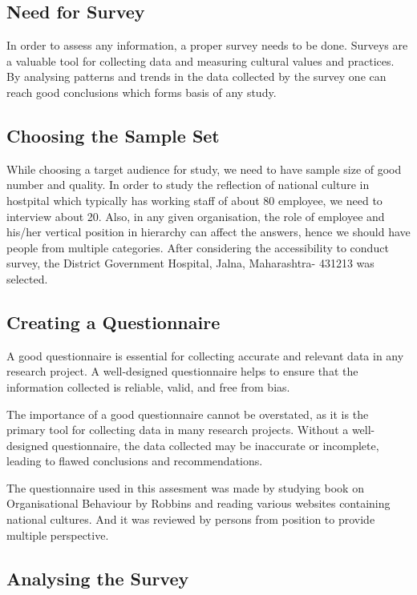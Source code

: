 \documentclass{article}
\begin{document}
\subsection{Need for Survey}

In order to assess any information, a proper survey needs to be done. Surveys are a valuable tool for collecting data and measuring cultural values and practices. By analysing patterns and trends in the data collected by the survey one can reach good conclusions which forms basis of any study.

\subsection{Choosing the Sample Set}

While choosing a target audience for study, we need to have sample size of good number and quality. In order to study the reflection of national culture in hostpital which typically has working staff of about 80 employee, we need to interview about 20. Also, in any given organisation, the role of employee and his/her vertical position in hierarchy can affect the answers, hence we should have people from multiple categories. After considering the accessibility to conduct survey, the District Government Hospital, Jalna, Maharashtra- 431213 was selected.

\subsection{Creating a Questionnaire}

A good questionnaire is essential for collecting accurate and relevant data in any research project. A well-designed questionnaire helps to ensure that the information collected is reliable, valid, and free from bias.

The importance of a good questionnaire cannot be overstated, as it is the primary tool for collecting data in many research projects. Without a well-designed questionnaire, the data collected may be inaccurate or incomplete, leading to flawed conclusions and recommendations.

The questionnaire used in this assesment was made by studying book on Organisational Behaviour by Robbins and reading various websites containing national cultures. And it was reviewed by persons from position to provide multiple perspective.

\subsection{Analysing the Survey}
\end{document}
